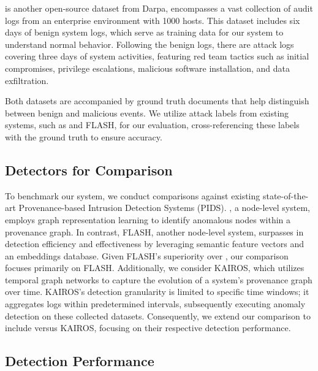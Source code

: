 \optc is another open-source dataset from Darpa, encompasses a vast collection of audit logs from an enterprise environment with 1000 hosts. This dataset includes six days of benign system logs, which serve as training data for our system to understand normal behavior. Following the benign logs, there are attack logs covering three days of system activities, featuring red team tactics such as initial compromises, privilege escalations, malicious software installation, and data exfiltration.

Both datasets are accompanied by ground truth documents that help distinguish between benign and malicious events. We utilize attack labels from existing systems, such as \threatrace and FLASH, for our evaluation, cross-referencing these labels with the ground truth to ensure accuracy.

\subsection{Detectors for Comparison}

To benchmark our system, we conduct comparisons against existing state-of-the-art Provenance-based Intrusion Detection Systems (PIDS). \threatrace, a node-level system, employs graph representation learning to identify anomalous nodes within a provenance graph. In contrast, FLASH, another node-level system, surpasses \threatrace in detection efficiency and effectiveness by leveraging semantic feature vectors and an embeddings database. Given FLASH's superiority over \threatrace, our comparison focuses primarily on FLASH. Additionally, we consider KAIROS, which utilizes temporal graph networks to capture the evolution of a system's provenance graph over time. KAIROS's detection granularity is limited to specific time windows; it aggregates logs within predetermined intervals, subsequently executing anomaly detection on these collected datasets. Consequently, we extend our comparison to include \Sys versus KAIROS, focusing on their respective detection performance.

 \subsection{Detection Performance}

